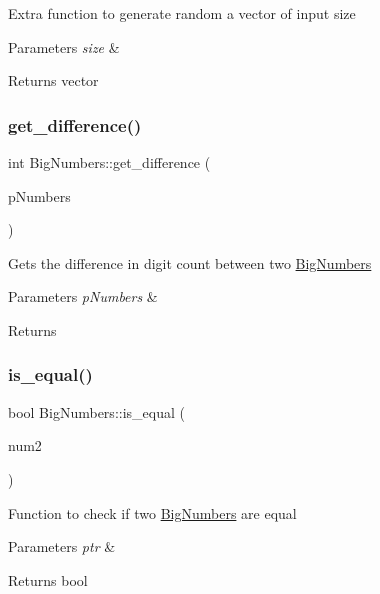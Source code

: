 Extra function to generate random a vector of input size 
\begin{DoxyParams}{Parameters}
{\em size} & \\
\hline
\end{DoxyParams}
\begin{DoxyReturn}{Returns}
vector 
\end{DoxyReturn}
\mbox{\label{classBigNumbers_a019f694d325d65cee5c3a0937b428c9e}} 
\subsubsection{\texorpdfstring{get\+\_\+difference()}{get\_difference()}}
{\footnotesize\ttfamily int Big\+Numbers\+::get\+\_\+difference (\begin{DoxyParamCaption}\item[{\mbox{\hyperlink{classBigNumbers}{Big\+Numbers}} $\ast$}]{p\+Numbers }\end{DoxyParamCaption})}

Gets the difference in digit count between two \mbox{\hyperlink{classBigNumbers}{Big\+Numbers}} 
\begin{DoxyParams}{Parameters}
{\em p\+Numbers} & \\
\hline
\end{DoxyParams}
\begin{DoxyReturn}{Returns}

\end{DoxyReturn}
\mbox{\label{classBigNumbers_ad5638daadb14c31d3c262a5b963e015f}} 
\subsubsection{\texorpdfstring{is\+\_\+equal()}{is\_equal()}}
{\footnotesize\ttfamily bool Big\+Numbers\+::is\+\_\+equal (\begin{DoxyParamCaption}\item[{\mbox{\hyperlink{classBigNumbers}{Big\+Numbers}} $\ast$}]{num2 }\end{DoxyParamCaption})}

Function to check if two \mbox{\hyperlink{classBigNumbers}{Big\+Numbers}} are equal 
\begin{DoxyParams}{Parameters}
{\em ptr} & \\
\hline
\end{DoxyParams}
\begin{DoxyReturn}{Returns}
bool 
\end{DoxyReturn}
\mbox{\label{classBigNumbers_a79f79dcbd53531d1b72710adc3e0edbd}} 
